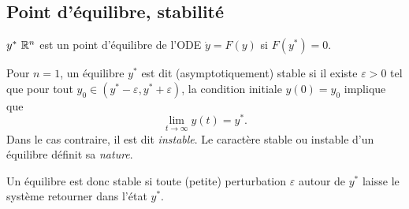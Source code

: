 \subsection{Point d'équilibre, stabilité} 

\begin{definition}
  $y^* \ \mathbb{R}^n$ est un point d'équilibre de l'ODE $\dot y = F(y)$ si $F(y^*) = 0$.
\end{definition}

\begin{definition}[Stabilité ($n = 1$)]
  Pour $n = 1$, un équilibre $y^*$ est dit (asymptotiquement) stable si il existe $\varepsilon > 0$ tel que pour tout $y_0 \in (y^* - \varepsilon, y^* + \varepsilon)$, la condition initiale $y(0) = y_0$ implique que 
  $$
  \lim_{t \to \infty} y(t) = y^*.
  $$
  Dans le cas contraire, il est dit {\em instable}. Le caractère stable ou instable d'un équilibre définit sa {\em nature}.
\end{definition}

\remark
Un équilibre est donc stable si toute (petite) perturbation $\varepsilon$ autour de $y^*$ laisse le système retourner dans l'état $y^*$.


